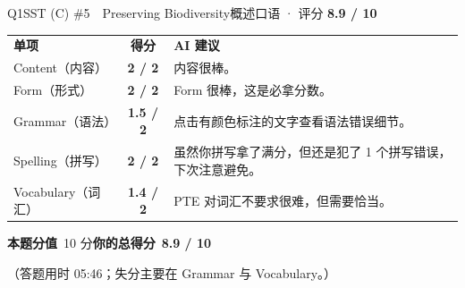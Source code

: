 \documentclass[11pt]{article}
\newcommand{\sfull}[1]{\textcolor{cFix}{\bfseries #1}}     %
\newcommand{\spart}[1]{\textcolor{cPartial}{\bfseries #1}} %
\begin{document}
\begin{qblock}{Q1\quad SST (C) \#5\ \ Preserving Biodiversity}{概述口语 · 评分 \textcolor{cAccent}{\bfseries 8.9 / 10}}
\begin{notebox}
{\renewcommand{\arraystretch}{1.35}
\begin{tabularx}{\linewidth}{@{}l c Z@{}}
\textbf{单项} & \textbf{得分} & \textbf{AI 建议}\\[2pt]
Content（内容）& \sfull{2 / 2} & 内容很棒。\\
Form（形式）& \sfull{2 / 2} & Form 很棒，这是必拿分数。\\
Grammar（语法）& \spart{1.5 / 2} & 点击有颜色标注的文字查看语法错误细节。\\
Spelling（拼写）& \sfull{2 / 2} & 虽然你拼写拿了满分，但还是犯了 1 个拼写错误，下次注意避免。\\
Vocabulary（词汇）& \spart{1.4 / 2} & PTE 对词汇不要求很难，但需要恰当。\\
\end{tabularx}}
\smallskip
\textbf{本题分值}\ 10 分\qquad\textbf{你的总得分}\ \textcolor{cAccent}{\bfseries 8.9 / 10}
\end{notebox}
\smallskip
{\footnotesize\color{gray}（答题用时 05:46；失分主要在 Grammar 与 Vocabulary。）}
\end{qblock}
\end{document}
